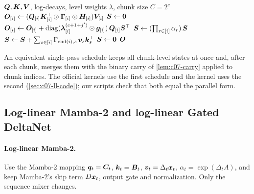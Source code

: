\begin{algorithm}[t]
\caption{Log-linear attention: chunkwise forward pass (one head, $T = N_cC$).}
\label{alg:c07-ll-chunk}
\begin{algorithmic}[1]
\Require $\bm{Q},\bm{K},\bm{V}$, log-decays, level weights $\lambda$, chunk size $C = 2^c$
 
  \State $\bm{O}_{[i]} \gets (\bm{Q}_{[i]}\bm{K}_{[i]}^{\top}\odot\bm{\Gamma}_{[i]}\odot\bm{H}_{[i]})\bm{V}_{[i]}$ 
\EndFor
{} 
  \State $\bm{S} \gets \bm{0}$
      \State $\bm{O}_{[i]} \gets \bm{O}_{[i]} + \operatorname{diag}(\bm{\lambda}^{(c+1+j')}_{[i]}\odot\bm{g}_{[i]})\,\bm{Q}_{[i]}\bm{S}^{\top}$ 
    \EndIf
    \State $\bm{S} \gets (\textstyle\prod_{r\in[i]}\alpha_r)\,\bm{S}$
     \State $\bm{S} \gets \bm{S} + \sum_{s\in[i]} \Gamma_{\mathrm{end}(i),s}\,\bm{v}_s\bm{k}_s^{\top}$  \EndIf
     \State $\bm{S} \gets \bm{0}$  \EndIf
  \EndFor
\EndFor
\State \Return $\bm{O}$
\end{algorithmic}
\end{algorithm}

An equivalent single-pass schedule keeps all chunk-level states at once and, after each
chunk, merges them with the binary carry of \cref{lem:c07-carry} applied to chunk indices. The
official kernels use the first schedule and the \fla{} kernel uses the second
(\cref{sec:c07-ll-code}); our scripts check that both equal the parallel form.

\subsection{Log-linear Mamba-2 and log-linear Gated DeltaNet}\label{sec:c07-ll-variants}

\paragraph{Log-linear Mamba-2.} Use the Mamba-2 mapping $\bm{q}_t = \bm{C}_t$, $\bm{k}_t = \bm{B}_t$,
$\bm{v}_t = \Delta_t\bm{x}_t$, $\alpha_t = \exp(\Delta_t A)$, and keep Mamba-2's skip term
$D\bm{x}_t$, output gate and normalization. Only the sequence mixer changes.

